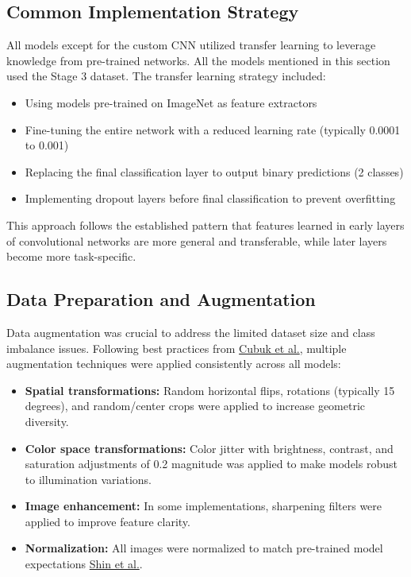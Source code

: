 \documentclass[a4paper,12pt]{report}
\begin{document}
\subsection{Common Implementation Strategy}

All models except for the custom CNN utilized transfer learning to leverage knowledge from pre-trained networks. All the models mentioned in this section used the Stage 3 dataset. The transfer learning strategy included:

\begin{itemize}
    \item Using models pre-trained on ImageNet as feature extractors
    \item Fine-tuning the entire network with a reduced learning rate (typically 0.0001 to 0.001)
    \item Replacing the final classification layer to output binary predictions (2 classes)
    \item Implementing dropout layers before final classification to prevent overfitting
\end{itemize}

This approach follows the established pattern that features learned in early layers of convolutional networks are more general and transferable, while later layers become more task-specific.

\subsection{Data Preparation and Augmentation}

Data augmentation was crucial to address the limited dataset size and class imbalance issues. Following best practices from \href{https://arxiv.org/abs/1712.04621}{Cubuk et al.}, multiple augmentation techniques were applied consistently across all models:

\begin{itemize}
    \item \textbf{Spatial transformations:} Random horizontal flips, rotations (typically 15 degrees), and random/center crops were applied to increase geometric diversity.
    \item \textbf{Color space transformations:} Color jitter with brightness, contrast, and saturation adjustments of 0.2 magnitude was applied to make models robust to illumination variations.
    \item \textbf{Image enhancement:} In some implementations, sharpening filters were applied to improve feature clarity.
    \item \textbf{Normalization:} All images were normalized to match pre-trained model expectations \href{https://arxiv.org/abs/1803.08494}{Shin et al.}.
\end{itemize}
\end{document}
